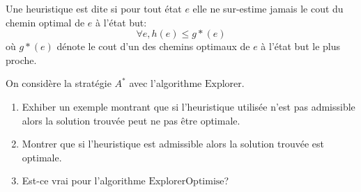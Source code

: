 \begin{td-exo}[] %
	Une heuristique est dite  si pour tout état \(e\) elle
	ne sur-estime jamais le cout du chemin optimal de \(e\) à l'état but:
	\begin{equation*}
		\forall e, h(e) \leq g*(e)
	\end{equation*}
	où \(g*(e)\) dénote le cout d'un des chemins optimaux de
	\(e\) à l'état but le plus proche.

	On considère la stratégie \(A^\ast\) avec l'algorithme \(\text{Explorer}\).
	\begin{enumerate}
		\item Exhiber un exemple montrant que si l'heuristique utilisée n'est pas
		admissible alors la solution trouvée peut ne pas être optimale.

		\item Montrer que si l'heuristique est admissible alors la solution
		trouvée est optimale.

		\item Est-ce vrai pour l'algorithme \(\text{ExplorerOptimise}\)?
	\end{enumerate}
\end{td-exo}

